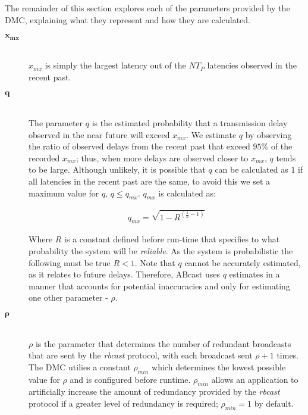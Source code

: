        The remainder of this section explores each of the parameters provided by the DMC, explaining what they represent and how they are calculated.  
        
        \begin{description}
        \item[\Huge$\boldsymbol{x_{mx}}$] \hfill \\
        $x_{mx}$ is simply the largest latency out of the $NT_P$ latencies observed in the recent past.  
        
        \item[\Huge$\boldsymbol{q}$] \hfill \\
                The parameter $q$ is the estimated probability that a transmission delay observed in the near future will exceed $x_{mx}$.  We estimate $q$ by observing the ratio of observed delays from the recent past that exceed $95\%$ of the recorded $x_{mx}$; thus, when more delays are observed closer to $x_{mx}$, $q$ tends to be large.  Although unlikely, it is possible that $q$ can be calculated as $1$ if all latencies in the recent past are the same, to avoid this we set a maximum value for $q$, $ q \leq q_{mx}$.  $q_{mx}$ is calculated as: 

        \begin{equation*}
		     \begin{aligned}
		          q_{mx} = \sqrt{1 - R^{(\frac{1}{n} - 1)}}
		     \end{aligned}
        \end{equation*}
        
        Where $R$ is a constant defined before run-time that specifies to what probability the system will be \emph{reliable}.  As the system is probabilistic the following must be true $R < 1$.  Note that $q$ cannot be accurately estimated, as it relates to future delays.  Therefore, \textsf{ABcast} uses $q$ estimates in a manner that accounts for potential inaccuracies and only for estimating one other parameter - $\rho$.
	
	    \item[\Huge$\boldsymbol{\rho}$] \hfill \\
	    $\rho$ is the parameter that determines the number of redundant broadcasts that are sent by the \emph{rbcast} protocol, with each broadcast sent $\rho + 1$ times.  The DMC utilies a constant $\rho_{min}$ which determines the lowest possible value for $\rho$ and is configured before runtime.  $\rho_{min}$ allows an application to artificially increase the amount of redundancy provided by the \emph{rbcast} protocol if a greater level of redundancy is required; $\rho_{min} = 1$ by default.
	    

\end{description}
